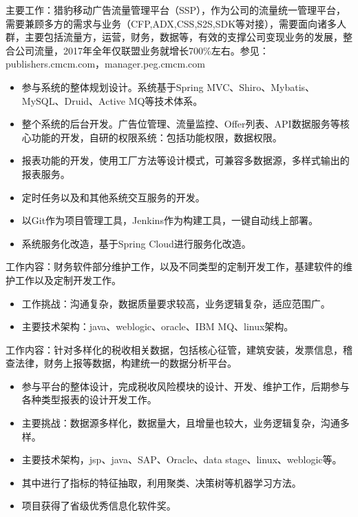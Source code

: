 \documentclass{resume}
\begin{document}
\begin{onehalfspacing}
主要工作：猎豹移动广告流量管理平台（SSP），作为公司的流量统一管理平台，需要兼顾多方的需求与业务（CFP,ADX,CSS,S2S,SDK等对接），需要面向诸多人群，主要包括流量方，运营，财务，数据等，有效的支撑公司变现业务的发展，整合公司流量，2017年全年仅联盟业务就增长700\%左右。参见：publishers.cmcm.com，manager.peg.cmcm.com
\begin{itemize}
  \item 参与系统的整体规划设计。系统基于Spring MVC、Shiro、Mybatis、MySQL、Druid、Active MQ等技术体系。
  \item 整个系统的后台开发。广告位管理、流量监控、Offer列表、API数据服务等核心功能的开发，自研的权限系统：包括功能权限，数据权限。
  \item 报表功能的开发，使用工厂方法等设计模式，可兼容多数据源，多样式输出的报表服务。
  \item 定时任务以及和其他系统交互服务的开发。
  \item 以Git作为项目管理工具，Jenkins作为构建工具，一键自动线上部署。
  \item 系统服务化改造，基于Spring Cloud进行服务化改造。 
\end{itemize}
\end{onehalfspacing}

\begin{onehalfspacing}
工作内容：财务软件部分维护工作，以及不同类型的定制开发工作，基建软件的维护工作以及定制开发工作。
\begin{itemize}
  \item 工作挑战：沟通复杂，数据质量要求较高，业务逻辑复杂，适应范围广。
  \item 主要技术架构：java、weblogic、oracle、IBM MQ、linux架构。
\end{itemize}
\end{onehalfspacing}

\begin{onehalfspacing}
工作内容：针对多样化的税收相关数据，包括核心征管，建筑安装，发票信息，稽查法律，财务上报等数据，构建统一的数据分析平台。
\begin{itemize}
  \item 参与平台的整体设计，完成税收风险模块的设计、开发、维护工作，后期参与各种类型报表的设计开发工作。
  \item 主要挑战：数据源多样化，数据量大，且增量也较大，业务逻辑复杂，沟通多样。
  \item 主要技术架构，jsp、java、SAP、Oracle、data stage、linux、weblogic等。
  \item 其中进行了指标的特征抽取，利用聚类、决策树等机器学习方法。
  \item 项目获得了省级优秀信息化软件奖。
\end{itemize}
\end{onehalfspacing}
\end{document}
